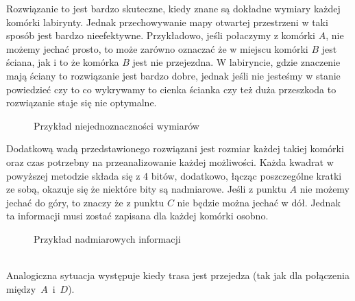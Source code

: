             Rozwiązanie to jest bardzo skuteczne, kiedy znane są dokładne wymiary każdej komórki labirynty.
            Jednak przechowywanie mapy otwartej przestrzeni w taki sposób jest bardzo nieefektywne.
            Przykładowo, jeśli połaczymy z komórki $A$, nie możemy jechać prosto, to może zarówno oznaczać że w miejscu komórki $B$ jest ściana, jak i to że komórka $B$ jest nie przejezdna.
            W labiryncie, gdzie znaczenie mają ściany to rozwiązanie jest bardzo dobre, jednak jeśli nie jesteśmy w stanie powiedzieć czy to co wykrywamy to cienka ścianka czy też duża przeszkoda to rozwiązanie staje się nie optymalne.
            
            \begin{figure}[!ht]
                \centering
                \caption{Przykład niejednoznaczności wymiarów}
            \end{figure}
            
            Dodatkową wadą przedstawionego rozwiązani jest rozmiar każdej takiej komórki oraz czas potrzebny na przeanalizowanie każdej możliwości.
            Każda kwadrat w powyższej metodzie składa się z 4 bitów, dodatkowo, łącząc poszczególne kratki ze sobą, okazuje się że niektóre bity są nadmiarowe.
            Jeśli z punktu $A$ nie możemy jechać do góry, to znaczy że z punktu $C$ nie będzie można jechać w dół.
            Jednak ta informacji musi zostać zapisana dla każdej komórki osobno.
            \begin{figure}[!ht]
                \centering
                \caption{Przykład nadmiarowych informacji}
            \end{figure}\\
            Analogiczna sytuacja występuje kiedy trasa jest przejedza (tak jak dla połączenia między~$A$~i~$D$).


